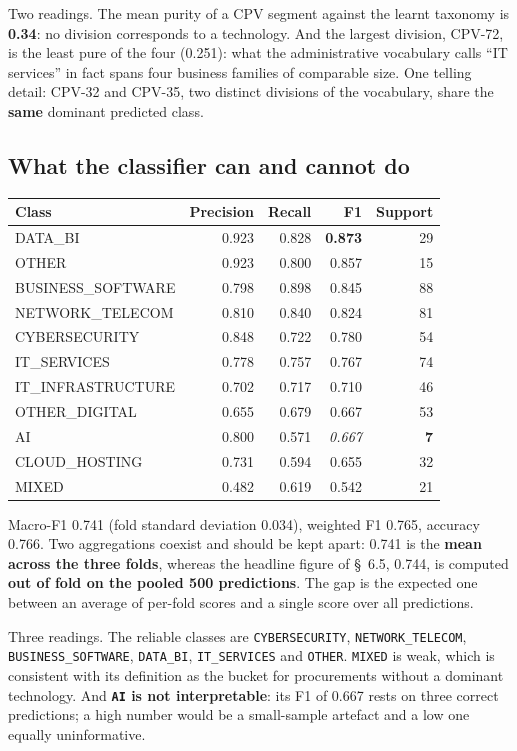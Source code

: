Two readings. The mean purity of a CPV segment against the learnt taxonomy is \textbf{0.34}: no division corresponds to a technology. And the largest division, CPV-72, is the least pure of the four (0.251): what the administrative vocabulary calls ``IT services'' in fact spans four business families of comparable size. One telling detail: CPV-32 and CPV-35, two distinct divisions of the vocabulary, share the \textbf{same} dominant predicted class.

\subsection{What the classifier can and cannot do}

\begingroup\footnotesize
\begin{longtable}[]{@{}lrrrr@{}}
\toprule\noalign{}
Class & Precision & Recall & F1 & Support \\
\midrule\noalign{}
\endhead
\bottomrule\noalign{}
\endlastfoot
DATA\_BI & 0.923 & 0.828 & \textbf{0.873} & 29 \\
OTHER & 0.923 & 0.800 & 0.857 & 15 \\
BUSINESS\_SOFTWARE & 0.798 & 0.898 & 0.845 & 88 \\
NETWORK\_TELECOM & 0.810 & 0.840 & 0.824 & 81 \\
CYBERSECURITY & 0.848 & 0.722 & 0.780 & 54 \\
IT\_SERVICES & 0.778 & 0.757 & 0.767 & 74 \\
IT\_INFRASTRUCTURE & 0.702 & 0.717 & 0.710 & 46 \\
OTHER\_DIGITAL & 0.655 & 0.679 & 0.667 & 53 \\
AI & 0.800 & 0.571 & \emph{0.667} & \textbf{7} \\
CLOUD\_HOSTING & 0.731 & 0.594 & 0.655 & 32 \\
MIXED & 0.482 & 0.619 & 0.542 & 21 \\
\end{longtable}
\endgroup

Macro-F1 0.741 (fold standard deviation 0.034), weighted F1 0.765, accuracy 0.766. Two aggregations coexist and should be kept apart: 0.741 is the \textbf{mean across the three folds}, whereas the headline figure of \S~6.5, 0.744, is computed \textbf{out of fold on the pooled 500 predictions}. The gap is the expected one between an average of per-fold scores and a single score over all predictions.

Three readings. The reliable classes are \texttt{CYBERSECURITY}, \texttt{NETWORK\_TELECOM}, \texttt{BUSINESS\_SOFTWARE}, \texttt{DATA\_BI}, \texttt{IT\_SERVICES} and \texttt{OTHER}. \texttt{MIXED} is weak, which is consistent with its definition as the bucket for procurements without a dominant technology. And \textbf{\texttt{AI} is not interpretable}: its F1 of 0.667 rests on three correct predictions; a high number would be a small-sample artefact and a low one equally uninformative.


